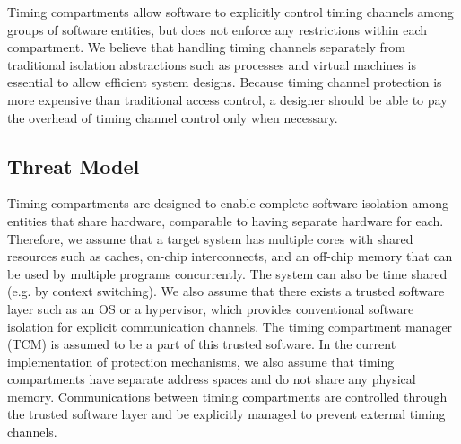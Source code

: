 
Timing compartments allow software to explicitly control timing channels
among groups of software entities, but does not enforce any restrictions within
each compartment. We believe that handling timing channels separately from
traditional isolation abstractions such as processes and virtual machines is 
essential to allow efficient system designs. Because timing channel protection
is more expensive than traditional access control, a designer should be able
to pay the overhead of timing channel control only when necessary.


\subsection{Threat Model}

Timing compartments are designed to enable complete software isolation among
entities that share hardware, comparable to having separate hardware for each.
Therefore, we assume that a target system has multiple cores with shared
resources such as caches, on-chip interconnects, and an off-chip memory that can
be used by multiple programs concurrently. The system can also be time shared 
(e.g. by context switching).
We also assume that there exists a trusted software layer such as an OS or a 
hypervisor,
which provides conventional software isolation for explicit communication 
channels.
The timing compartment manager (TCM) is assumed to be a part of this trusted 
software.
In the current implementation of protection mechanisms, we also assume that
timing compartments have separate address spaces and do not share any physical
memory. Communications between timing compartments are controlled through the 
trusted
software layer and be explicitly managed to prevent external timing channels. 

